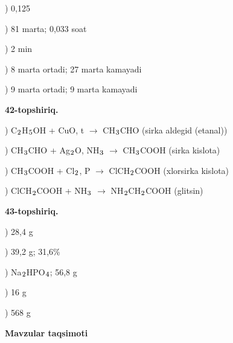 \documentclass[11pt,a4paper]{article}
\renewcommand{\textsubscript}[1]{\ensuremath{_{\text{\fontsize{8}{8}\selectfont #1}}}}
\begin{document}
) 0,125\par
{}) 81 marta; 0,033 soat\par
{}) 2 min\par
{}) 8 marta ortadi; 27 marta kamayadi\par
{}) 9 marta ortadi; 9 marta kamayadi\par
\noindent\textbf{42-topshiriq.}\par
{}) C\textsubscript{2}H\textsubscript{5}OH + CuO, t\textdegree{} $\to$ CH\textsubscript{3}CHO (sirka aldegid (etanal))\par
{}) CH\textsubscript{3}CHO + Ag\textsubscript{2}O, NH\textsubscript{3} $\to$ CH\textsubscript{3}COOH (sirka kislota)\par
{}) CH\textsubscript{3}COOH + Cl\textsubscript{2}, P $\to$ ClCH\textsubscript{2}COOH (xlorsirka kislota)\par
{}) ClCH\textsubscript{2}COOH + NH\textsubscript{3} $\to$ NH\textsubscript{2}CH\textsubscript{2}COOH (glitsin)\par
\noindent\textbf{43-topshiriq.}\par
{}) 28,4 g\par
{}) 39,2 g; 31,6\%\par
{}) Na\textsubscript{2}HPO\textsubscript{4}; 56,8 g\par
{}) 16 g\par
{}) 568 g\par
\par\bigskip\noindent\textbf{Mavzular taqsimoti}\par\smallskip
\end{document}
